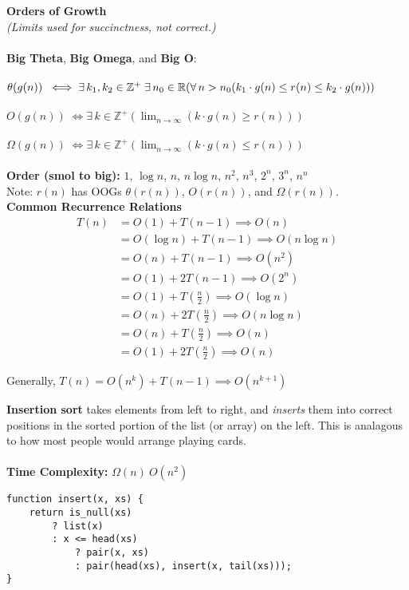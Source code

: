 \documentclass[a4paper]{article} \usepackage[backend=biber, style=numeric, sorting=none]{biblatex}
\begin{document}
\begin{multicols*}{4}
\divider
\\ \\
{\small\textbf{Orders of Growth}}
\\
\textit{(Limits used for succinctness, not correct.)}\\ \\
\textbf{Big Theta},  \textbf{Big Omega}, and \textbf{Big O}:
\\ \\
$\theta(g(n))\; \iff \exists \, k_1, k_2 \in \mathbb{Z}^+ \; \exists \, n_0 \in \mathbb{R}  \\
( \forall \, n > n_0 (k_{1} \cdot g(n) \leq r(n) \leq k_{2} \cdot g(n))) $
\\ \\
$O(g(n))\; \iff \exists \, k \in \mathbb{Z}^+  ( \lim_{n \to \infty } (k \cdot g(n) \geq r(n) )) $
\\ \\
$\Omega(g(n))\; \iff \exists \, k \in \mathbb{Z}^+  ( \lim_{n \to \infty } (k \cdot g(n) \leq r(n) )) $
\\ \\
\textbf{Order (smol to big):} $1$, $\log n$, $n$, $n \log n$, $n^{2}$, $n^{3}$, $2^{n}$, $3^{n}$, $n^{n}$ \\

Note: $r(n)$ has OOGs $\theta(r(n))$, $O(r(n))$, and $\Omega(r(n))$. \\

{\textbf{Common Recurrence Relations}}
\begin{align*}
    T(n) & = O(1) + T(n-1) \implies O(n) \\
        & = O(\log n) + T(n-1) \implies O(n \log n) \\
        & = O(n) + T(n-1) \implies O(n^2) \\
        & = O(1) + 2T(n-1) \implies O(2^n) \\
        & = O(1) + T(\frac{n}{2}) \implies O(\log n) \\
        & = O(n) + 2T(\frac{n}{2}) \implies O(n \log n) \\ 
        & = O(n) + T(\frac{n}{2}) \implies O(n) \\
        & = O(1) + 2T(\frac{n}{2}) \implies O(n)
\end{align*}

Generally, $T(n) = O(n^k) + T(n-1)  \implies O(n^{k+1})$ \\

\vfill\null
\columnbreak


{\small\textbf{Insertion sort}} takes elements from left to right, and \textit{inserts} them into correct positions in the sorted portion of the list (or array) on the left. This is analagous to how most people would arrange playing cards.
\\ \\
\textbf{Time Complexity:} $\Omega(n)\ O(n^{2})$
\begin{verbatim}
function insert(x, xs) {
    return is_null(xs)
        ? list(x)
        : x <= head(xs)
            ? pair(x, xs)
            : pair(head(xs), insert(x, tail(xs)));
}


\end{verbatim}
\end{multicols*}
\end{document}
